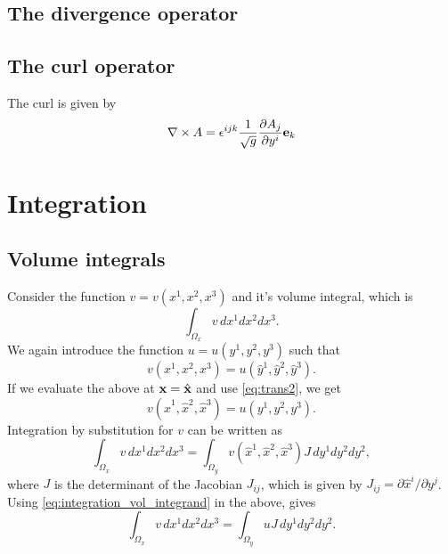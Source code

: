 \documentclass[11pt]{article}
\newcommand{\yhat}{\hat{y}}
\newcommand{\xhat}{\hat{x}}
\begin{document}
\subsection{The divergence operator}

\subsection{The curl operator}
The curl is given by
\begin{equation}
    \nabla \times A = \epsilon^{ijk} \frac{1}{\sqrt{g}} \frac{\partial A_j}{\partial y^i} \mathbf{e}_k
\end{equation}

\section{Integration}

\subsection{Volume integrals}
Consider the function $v = v(x^1, x^2, x^3)$ and it's volume integral, which is
\begin{equation}
    \int_{\Omega_x} v \, dx^1 dx^2 dx^3.
\end{equation}
We again introduce the function $u = u(y^1, y^2, y^3)$ such that
\begin{equation}
    v(x^1, x^2, x^3) = u(\yhat^1, \yhat^2, \yhat^3).
\end{equation}
If we evaluate the above at $\mathbf{x} = \hat{\mathbf{x}}$ and use \cref{eq:trans2}, we get
\begin{equation}
    \label{eq:integration_vol_integrand}
    v(\xhat^1, \xhat^2, \xhat^3) = u(y^1, y^2, y^3).
\end{equation}
Integration by substitution for $v$ can be written as
\begin{equation}
    \int_{\Omega_x} v \, dx^1 dx^2 dx^3 = \int_{\Omega_y} v(\xhat^1, \xhat^2, \xhat^3) J \, dy^1 dy^2 dy^2,
\end{equation}
where $J$ is the determinant of the Jacobian $J_{ij}$, which is given by $J_{ij} = \partial \hat{x}^i / \partial y^j$.
Using \cref{eq:integration_vol_integrand} in the above, gives
\begin{equation}
    \int_{\Omega_x} v \, dx^1 dx^2 dx^3 = \int_{\Omega_y} u J \, dy^1 dy^2 dy^2.
\end{equation}
\end{document}
